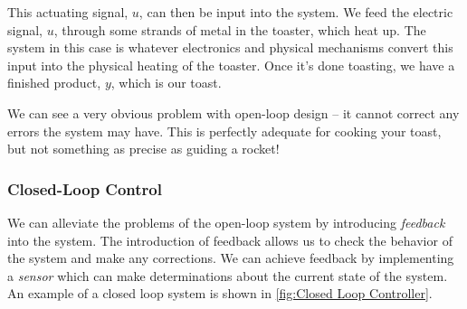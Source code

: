 This actuating signal, $u$, can then be input into the system. We feed the electric signal, $u$, through some strands of metal in the toaster, which heat up. The system in this case is whatever electronics and physical mechanisms convert this input into the physical heating of the toaster. Once it's done toasting, we have a finished product, $y$, which is our toast.

We can see a very obvious problem with open-loop design -- it cannot correct any errors the system may have. This is perfectly adequate for cooking your toast, but not something as precise as guiding a rocket!
\subsubsection{Closed-Loop Control}
We can alleviate the problems of the open-loop system by introducing \textit{feedback} into the system. The introduction of feedback allows us to check the behavior of the system and make any corrections. We can achieve feedback by implementing a \textit{sensor} which can make determinations about the current state of the system. An example of a closed loop system is shown in \autoref{fig:Closed Loop Controller}.

